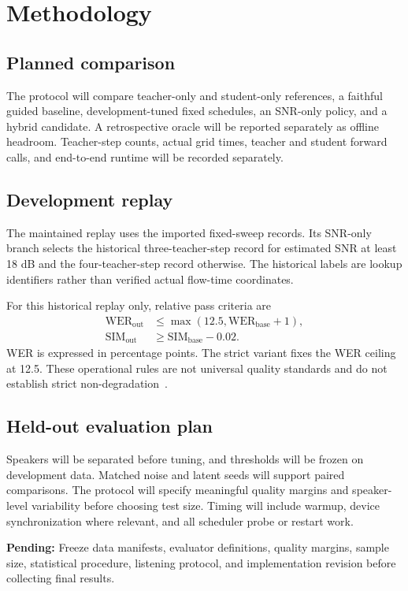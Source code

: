 \documentclass[12pt,a4paper,oneside]{report}
\newcommand{\pending}[1]{\par\noindent\textbf{Pending:} #1\par}
\begin{document}
\chapter{Methodology}
\label{ch:method}
\section{Planned comparison}
The protocol will compare teacher-only and student-only references, a faithful guided baseline, development-tuned fixed schedules, an SNR-only policy, and a hybrid candidate. A retrospective oracle will be reported separately as offline headroom. Teacher-step counts, actual grid times, teacher and student forward calls, and end-to-end runtime will be recorded separately.
\section{Development replay}
The maintained replay uses the imported fixed-sweep records. Its SNR-only branch selects the historical three-teacher-step record for estimated SNR at least 18 dB and the four-teacher-step record otherwise. The historical labels are lookup identifiers rather than verified actual flow-time coordinates.

For this historical replay only, relative pass criteria are
\begin{align}
\mathrm{WER}_{\mathrm{out}} &\leq \max(12.5,\mathrm{WER}_{\mathrm{base}}+1),\\
\mathrm{SIM}_{\mathrm{out}} &\geq \mathrm{SIM}_{\mathrm{base}}-0.02.
\end{align}
WER is expressed in percentage points. The strict variant fixes the WER ceiling at 12.5. These operational rules are not universal quality standards and do not establish strict non-degradation~\cite{internal-audit-2026}.
\section{Held-out evaluation plan}
Speakers will be separated before tuning, and thresholds will be frozen on development data. Matched noise and latent seeds will support paired comparisons. The protocol will specify meaningful quality margins and speaker-level variability before choosing test size. Timing will include warmup, device synchronization where relevant, and all scheduler probe or restart work.
\pending{Freeze data manifests, evaluator definitions, quality margins, sample size, statistical procedure, listening protocol, and implementation revision before collecting final results.}
\end{document}
